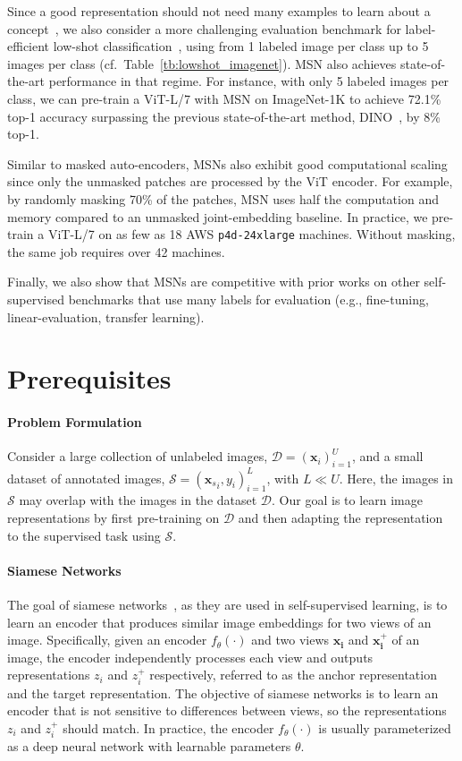 \documentclass{article}
\begin{document}
Since a good representation should not need many examples to learn about a concept~\citep{goyal2019scaling}, we also consider a more challenging evaluation benchmark for label-efficient low-shot classification~\citep{sohn2020fixmatch,lucas2021barely}, using from 1 labeled image per class up to 5 images per class (cf.~Table~\ref{tb:lowshot_imagenet}).
MSN also achieves state-of-the-art performance in that regime.
For instance, with only 5 labeled images per class, we can pre-train a ViT-L/7 with MSN on ImageNet-1K to achieve 72.1\% top-1 accuracy surpassing the previous state-of-the-art method, DINO~\citep{caron2021emerging}, by 8\% top-1. 

Similar to masked auto-encoders, MSNs also exhibit good computational scaling since only the unmasked patches are processed by the ViT encoder.
For example, by randomly masking 70\% of the patches, MSN uses half the computation and memory compared to an unmasked joint-embedding baseline. In practice, we pre-train a ViT-L/7 on as few as 18 AWS {\tt p4d-24xlarge} machines. Without masking, the same job requires over 42 machines.

Finally, we also show that MSNs are competitive with prior works on other self-supervised benchmarks that use many labels for evaluation (e.g., fine-tuning, linear-evaluation, transfer learning).

\section{Prerequisites}

\paragraph{Problem Formulation}
Consider a large collection of unlabeled images, $\mathcal{D}=(\mathbf{x}_i)_{i=1}^U$, and a small dataset of annotated images, $\mathcal{S}=({\mathbf{x}_{s}}_i, y_i)_{i=1}^L$, with $L \ll U$.
Here, the images in $\mathcal{S}$ may overlap with the images in the dataset $\mathcal{D}$.
Our goal is to learn image representations by first pre-training on $\mathcal{D}$ and then adapting the representation to the supervised task using $\mathcal{S}$.

\paragraph{Siamese Networks}
The goal of siamese networks~\citep{becker1992self,bromley1993signature}, as they are used in self-supervised learning, is to learn an encoder that produces similar image embeddings for two views of an image.
Specifically, given an encoder $f_\theta(\cdot)$ and two views $\mathbf{x_i}$ and $\mathbf{x^+_i}$ of an image, the encoder independently processes each view and outputs representations $z_i$ and $z^+_i$ respectively, referred to as the anchor representation and the target representation.
The objective of siamese networks is to learn an encoder that is not sensitive to differences between views, so the representations $z_i$ and $z^+_i$ should match. In practice, the encoder $f_\theta(\cdot)$ is usually parameterized as a deep neural network with learnable parameters $\theta$.
\end{document}

